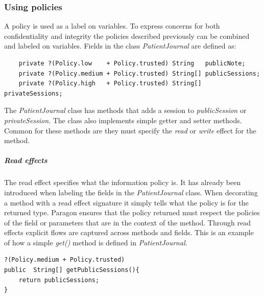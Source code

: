 


\subsubsection{Using policies}
A policy is used as a label on variables. To express concerns for both confidentiality and integrity the policies described previously can be combined and labeled on variables. Fields in the class \emph{PatientJournal} are defined as:

\begin{lstlisting}
	private ?(Policy.low    + Policy.trusted) String   publicNote;
	private ?(Policy.medium + Policy.trusted) String[] publicSessions;
	private ?(Policy.high   + Policy.trusted) String[] privateSessions;
\end{lstlisting}

The \emph{PatientJournal} class has methods that adds a session to \emph{publicSession} or \emph{privateSession}. The class also implements simple getter and setter methods. Common for these methods are they must specify the \emph{read} or \emph{write} effect for the method.




\subparagraph{Read effects}
The read effect specifies what the information policy is. It has already been introduced when labeling the fields in the \emph{PatientJournal} class. When decorating a method with a read effect signature it simply tells what the policy is for the returned type. Paragon ensures that the policy returned must respect the policies of the field or parameters that are in the context of the method. Through read effects explicit flows are captured across methods and fields. This is an example of how a simple \emph{get()} method is defined in \emph{PatientJournal}.
\begin{lstlisting}
?(Policy.medium + Policy.trusted)
public  String[] getPublicSessions(){
	return publicSessions;
}
\end{lstlisting}

